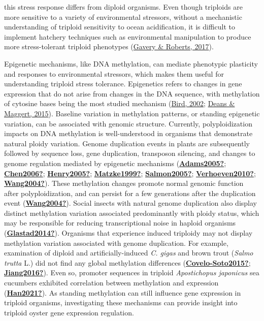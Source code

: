 \documentclass [11pt, proquest] {uwthesis}[2015/03/03]
\begin{document}
this stress response differs from diploid organisms. Even though triploids are more sensitive to a variety of environmental stressors, without a mechanistic understanding of triploid sensitivity to ocean acidification, it is difficult to implement hatchery techniques such as environmental manipulation to produce more stress-tolerant triploid phenotypes (\protect\hyperlink{ref-Gavery2017}{Gavery \& Roberts, 2017}).

Epigenetic mechanisms, like DNA methylation, can mediate phenotypic plasticity and responses to environmental stressors, which makes them useful for understanding triploid stress tolerance. Epigenetics refers to changes in gene expression that do not arise from changes in the DNA sequence, with methylation of cytosine bases being the most studied mechanism (\protect\hyperlink{ref-Bird2002}{Bird, 2002}; \protect\hyperlink{ref-Deans2015}{Deans \& Maggert, 2015}). Baseline variation in methylation patterns, or standing epigenetic variation, can be associated with genomic structure. Currently, polyploidization impacts on DNA methylation is well-understood in organisms that demonstrate natural ploidy variation. Genome duplication events in plants are subsequently followed by sequence loss, gene duplication, transposon silencing, and changes to genome regulation mediated by epigenetic mechanisms (\protect\hyperlink{ref-Adams2005}{\textbf{Adams2005?}}; \protect\hyperlink{ref-Chen2006}{\textbf{Chen2006?}}; \protect\hyperlink{ref-Henry2005}{\textbf{Henry2005?}}; \protect\hyperlink{ref-Matzke1999}{\textbf{Matzke1999?}}; \protect\hyperlink{ref-Salmon2005}{\textbf{Salmon2005?}}; \protect\hyperlink{ref-Verhoeven2010}{\textbf{Verhoeven2010?}}; \protect\hyperlink{ref-Wang2004}{\textbf{Wang2004?}}). These methylation changes promote normal genomic function after polyploidization, and can persist for a few generations after the duplication event (\protect\hyperlink{ref-Wang2004}{\textbf{Wang2004?}}). Social insects with natural genome duplication also display distinct methylation variation associated predominantly with ploidy status, which may be responsible for reducing transcriptional noise in haploid organisms (\protect\hyperlink{ref-Glastad2014}{\textbf{Glastad2014?}}). Organisms that experience induced triploidy may not display methylation variation associated with genome duplication. For example, examination of diploid and artificially-induced \emph{C. gigas} and brown trout (\emph{Salmo trutta} L.) did not find any global methylation differences (\protect\hyperlink{ref-Covelo-Soto2015}{\textbf{Covelo-Soto2015?}}; \protect\hyperlink{ref-Jiang2016}{\textbf{Jiang2016?}}). Even so, promoter sequences in triploid \emph{Apostichopus japonicus} sea cucumbers exhibited correlation between methylation and expression (\protect\hyperlink{ref-Han2021}{\textbf{Han2021?}}). As standing methylation can still influence gene expression in triploid organisms, investigating these mechanisms can provide insight into triploid oyster gene expression regulation.
\end{document}
